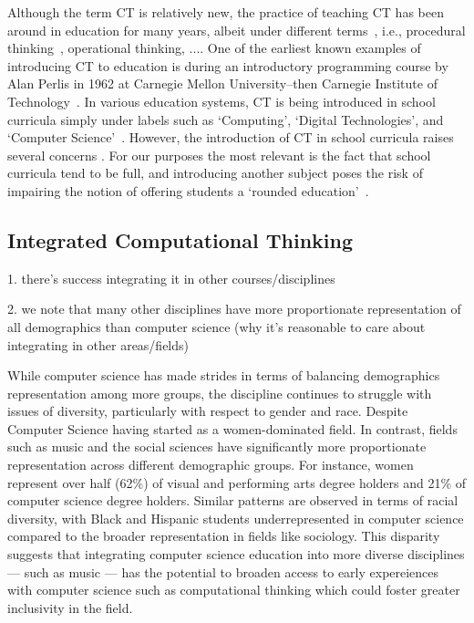 \documentclass[manuscript,screen,review]{acmart}
\begin{document}
Although the term CT is relatively new, the practice of teaching CT has been around in education for many years, albeit under different terms~\cite{czerkawski2015exploring}, i.e., procedural thinking~\cite{papert1980mindstorms}, operational thinking, .... One of the earliest known examples of introducing CT to education is during an introductory programming course by Alan Perlis in 1962 at Carnegie Mellon University--then Carnegie Institute of Technology~\cite{perlis1962computer}. In various education systems, CT is being introduced in school curricula simply under labels such as `Computing', `Digital Technologies', and `Computer Science'~\cite{duncan2015pilot, heintz2016reviewofmodels, hubwieser2015global}. However, the introduction of CT in school curricula raises several concerns \cite{tatar2017protoCT}. For our purposes the most relevant is the fact that school curricula tend to be full, and introducing another subject poses the risk of impairing the notion of offering students a `rounded education'~\cite{bell2018integrating}.

\subsection{Integrated Computational Thinking}
1. there's success integrating it in other courses/disciplines

2. we note that many other disciplines have more proportionate representation of all demographics than computer science (why it's reasonable to care about integrating in other areas/fields) 


While computer science has made strides in terms of balancing demographics representation among more groups, the discipline continues to struggle with issues of diversity, particularly with respect to gender and race. Despite Computer Science having started as a women-dominated field.
In contrast, fields such as music and the social sciences have significantly more proportionate representation across different demographic groups. For instance, women represent over half (62\%) of visual and performing arts degree holders and 21\% of computer science degree holders. Similar patterns are observed in terms of racial diversity, with Black and Hispanic students underrepresented in computer science compared to the broader representation in fields like sociology. This disparity suggests that integrating computer science education into more diverse disciplines --- such as music --- has the potential to broaden access to early expereiences with computer science such as computational thinking which could foster greater inclusivity in the field.
% 
\end{document}
